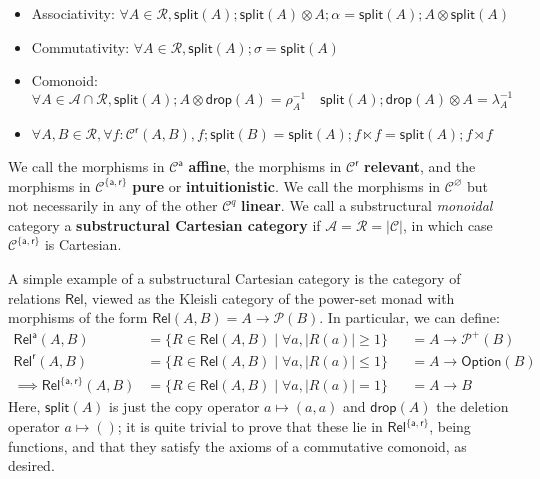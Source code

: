 \documentclass[acmsmall,screen,review]{acmart}
\newcommand{\mc}[1]{\ensuremath{\mathcal{#1}}}
\newcommand{\ms}[1]{\ensuremath{\mathsf{#1}}}
\begin{document}
\begin{definition}
\begin{itemize}
\begin{itemize}
      \item Associativity: \(\forall A \in \mc{R}, \ms{split}(A);\ms{split}(A) \otimes A;\alpha = \ms{split}(A);A \otimes \ms{split}(A)\)
      \item Commutativity: \(\forall A \in \mc{R}, \ms{split}(A);\sigma = \ms{split}(A)\)
      \item Comonoid: \(\forall A \in \mc{A} \cap \mc{R}, \ms{split}(A);A \otimes \ms{drop}(A) = \rho_A^{-1} \quad \ms{split}(A);\ms{drop}(A) \otimes A = \lambda_A^{-1}\)
      \item \(\forall A, B \in \mc{R}, \forall f: \mc{C}^{\ms{r}}(A, B), f;\ms{split}(B) = \ms{split}(A);f \ltimes f = \ms{split}(A);f\rtimes f\)
    \end{itemize}
  \end{itemize}
  We call the morphisms in \(\mc{C}^{\ms{a}}\) \textbf{affine}, the
  morphisms in \(\mc{C}^{\ms{r}}\) \textbf{relevant}, and the morphisms in
  \(\mc{C}^{\{\ms{a}, \ms{r}\}}\) \textbf{pure} or \textbf{intuitionistic}. We
  call the morphisms in \(\mc{C}^\varnothing\) but not necessarily in any of the
  other \(\mc{C}^q\) \textbf{linear}. We call a substructural \textit{monoidal}
  category a \textbf{substructural Cartesian category} if \(\mc{A} = \mc{R} =
  |\mc{C}|\), in which case \(\mc{C}^{\{\ms{a}, \ms{r}\}}\) is Cartesian.
\end{definition}
A simple example of a substructural Cartesian category is the category of
relations \(\ms{Rel}\), viewed as the Kleisli category of the power-set monad
with morphisms of the form \(\ms{Rel}(A, B) = A \to \mc{P}(B)\). In particular,
we can define:
\begin{equation}
  \begin{aligned}
    \ms{Rel}^{\ms{a}}(A, B) 
    &= \{R \in \ms{Rel}(A, B) \mid \forall a, |R(a)| \geq 1\} 
    &&= A \to \mc{P}^+(B) \\
    \ms{Rel}^{\ms{r}}(A, B) 
    &= \{R \in \ms{Rel}(A, B) \mid \forall a, |R(a)| \leq 1\} 
    &&= A \to \ms{Option}(B) \\
    \implies \ms{Rel}^{\{\ms{a}, \ms{r}\}}(A, B) 
    &= \{R \in \ms{Rel}(A, B) \mid \forall a, |R(a)| = 1\} 
    &&= A \to B
  \end{aligned}
\end{equation}
Here, \(\ms{split}(A)\) is just the copy operator \(a \mapsto (a, a)\) and
\(\ms{drop}(A)\) the deletion operator \(a \mapsto ()\); it is quite trivial to
prove that these lie in \(\ms{Rel}^{\{\ms{a}, \ms{r}\}}\), being functions, and
that they satisfy the axioms of a commutative comonoid, as desired. 
\end{document}
